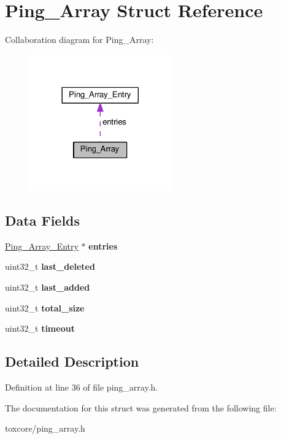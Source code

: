 \hypertarget{struct_ping___array}{\section{Ping\+\_\+\+Array Struct Reference}
\label{struct_ping___array}
}


Collaboration diagram for Ping\+\_\+\+Array\+:\nopagebreak
\begin{figure}[H]
\begin{center}
\leavevmode
\includegraphics[width=173pt]{struct_ping___array__coll__graph}
\end{center}
\end{figure}
\subsection*{Data Fields}
\begin{DoxyCompactItemize}
\item 
\hypertarget{struct_ping___array_a313b705ae8f0db8c02b2847b315ca1b1}{\hyperlink{struct_ping___array___entry}{Ping\+\_\+\+Array\+\_\+\+Entry} $\ast$ {\bfseries entries}}\label{struct_ping___array_a313b705ae8f0db8c02b2847b315ca1b1}

\item 
\hypertarget{struct_ping___array_ab3011676335a878a2c94492a37a63c3f}{uint32\+\_\+t {\bfseries last\+\_\+deleted}}\label{struct_ping___array_ab3011676335a878a2c94492a37a63c3f}

\item 
\hypertarget{struct_ping___array_a812ff28187c193e9a813628c36257df8}{uint32\+\_\+t {\bfseries last\+\_\+added}}\label{struct_ping___array_a812ff28187c193e9a813628c36257df8}

\item 
\hypertarget{struct_ping___array_acdfd526bb392e1ee59a3c6c545891b48}{uint32\+\_\+t {\bfseries total\+\_\+size}}\label{struct_ping___array_acdfd526bb392e1ee59a3c6c545891b48}

\item 
\hypertarget{struct_ping___array_ab5627d8d8b095c198e2523c44ca380ac}{uint32\+\_\+t {\bfseries timeout}}\label{struct_ping___array_ab5627d8d8b095c198e2523c44ca380ac}

\end{DoxyCompactItemize}


\subsection{Detailed Description}


Definition at line 36 of file ping\+\_\+array.\+h.



The documentation for this struct was generated from the following file\+:\begin{DoxyCompactItemize}
\item 
toxcore/ping\+\_\+array.\+h\end{DoxyCompactItemize}
